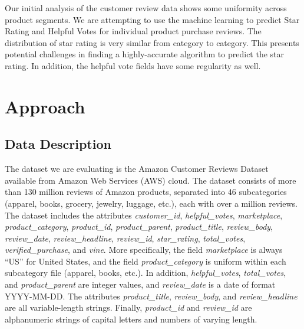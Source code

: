 \documentclass[10pt, conference, compsocconf]{IEEEtran}
\begin{document}
Our initial analysis of the customer review data shows some uniformity across product segments. We are attempting to use the machine learning to predict Star Rating and Helpful Votes for individual product purchase reviews. The distribution of star rating is very similar from category to category. This presents potential challenges in finding a highly-accurate algorithm to predict the star rating. In addition, the helpful vote fields have some regularity as well.


\section{Approach}\label{approach}

\subsection{Data Description} 

The dataset we are evaluating is the Amazon Customer Reviews Dataset available from Amazon  Web Services (AWS) cloud. The dataset consists of more than 130 million reviews of Amazon products, separated into 46 subcategories (apparel, books, grocery, jewelry, luggage, etc.), each with over a million reviews. The dataset includes the attributes \textit{customer\_id}, \textit{helpful\_votes}, \textit{marketplace}, \textit{product\_category}, \textit{product\_id}, \textit{product\_parent}, \textit{product\_title}, \textit{review\_body}, \textit{review\_date}, \textit{review\_headline}, \textit{review\_id}, \textit{star\_rating}, \textit{total\_votes}, \textit{verified\_purchase}, and \textit{vine}. More specifically, the field \textit{marketplace} is always “US” for United States, and the field \textit{product\_category} is uniform within each subcategory file (apparel, books, etc.). In addition, \textit{helpful\_votes}, \textit{total\_votes}, and \textit{product\_parent} are integer values, and \textit{review\_date} is a date of format YYYY-MM-DD. The attributes \textit{product\_title}, \textit{review\_body}, and \textit{review\_headline} are all variable-length strings. Finally, \textit{product\_id} and \textit{review\_id} are alphanumeric strings of capital letters and numbers of varying length.
\end{document}
